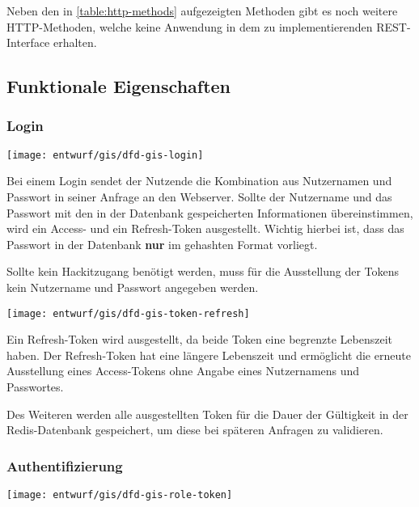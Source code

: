 Neben den in \autoref{table:http-methods} aufgezeigten Methoden gibt es noch weitere HTTP-Methoden, welche keine Anwendung in dem zu implementierenden REST-Interface erhalten.

\subsection{Funktionale Eigenschaften}
\subsubsection{Login}\label{subsub:login}
\begin{center}
	\texttt{[image: entwurf/gis/dfd-gis-login]}
\end{center}

Bei einem Login sendet der Nutzende die Kombination aus Nutzernamen und Passwort in seiner Anfrage an den Webserver. Sollte der Nutzername und das Passwort mit den in der Datenbank gespeicherten Informationen übereinstimmen, wird ein Access- und ein Refresh-Token ausgestellt. Wichtig hierbei ist, dass das Passwort in der Datenbank \textbf{nur} im gehashten Format vorliegt.

Sollte kein Hackitzugang benötigt werden, muss für die Ausstellung der Tokens kein Nutzername und Passwort angegeben werden.

\begin{center}
	\texttt{[image: entwurf/gis/dfd-gis-token-refresh]}
\end{center}

Ein Refresh-Token wird ausgestellt, da beide Token eine begrenzte Lebenszeit haben. Der Refresh-Token hat eine längere Lebenszeit und ermöglicht die erneute Ausstellung eines \linebreak Access-Tokens ohne Angabe eines Nutzernamens und Passwortes.

Des Weiteren werden alle ausgestellten Token für die Dauer der Gültigkeit in der Redis-Datenbank gespeichert, um diese bei späteren Anfragen zu validieren. 

\subsubsection{Authentifizierung}
\begin{center}
	\texttt{[image: entwurf/gis/dfd-gis-role-token]}
\end{center}

